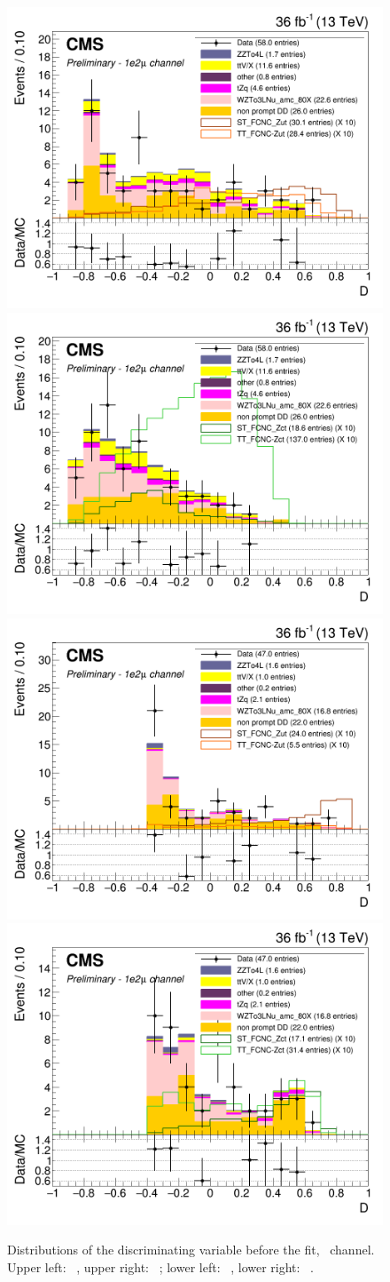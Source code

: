 \begin{figure}[ht]
	\centering
	  \includegraphics[width=0.39\linewidth]{6_Search/Figures/BDTunweighted/toppair_Zut_BDT_uue_Stack}
	  \includegraphics[width=0.39\linewidth]{6_Search/Figures/BDTunweighted/toppair_Zct_BDT_uue_Stack}
	  \includegraphics[width=0.39\linewidth]{6_Search/Figures/BDTunweighted/singletop_Zut_BDT_uue_Stack}
	  \includegraphics[width=0.39\linewidth]{6_Search/Figures/BDTunweighted/singletop_Zct_BDT_uue_Stack}
	\caption{Distributions of the discriminating variable before the fit, \emumu\  channel. Upper left: \TTSR\ \Zut , upper right: \TTSR\ \Zct ; lower left: \STSR\  \Zut , lower right: \STSR\  \Zct .}
	\label{fig:bdtuuestack}
\end{figure}

